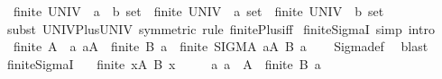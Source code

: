 \begin{isabellebody}
\ \ {\isachardoublequoteopen}finite\ {\isacharparenleft}{\kern0pt}UNIV\ {\isacharcolon}{\kern0pt}{\isacharcolon}{\kern0pt}\ {\isacharparenleft}{\kern0pt}{\isacharprime}{\kern0pt}a\ {\isacharplus}{\kern0pt}\ {\isacharprime}{\kern0pt}b{\isacharparenright}{\kern0pt}\ set{\isacharparenright}{\kern0pt}\ {\isasymlongleftrightarrow}\ finite\ {\isacharparenleft}{\kern0pt}UNIV\ {\isacharcolon}{\kern0pt}{\isacharcolon}{\kern0pt}\ {\isacharprime}{\kern0pt}a\ set{\isacharparenright}{\kern0pt}\ {\isasymand}\ finite\ {\isacharparenleft}{\kern0pt}UNIV\ {\isacharcolon}{\kern0pt}{\isacharcolon}{\kern0pt}\ {\isacharprime}{\kern0pt}b\ set{\isacharparenright}{\kern0pt}{\isachardoublequoteclose}\isanewline
%
\isadelimproof
\ \ %
\endisadelimproof
%
\isatagproof
{}\isamarkupfalse%
\ {\isacharparenleft}{\kern0pt}subst\ UNIV{\isacharunderscore}{\kern0pt}Plus{\isacharunderscore}{\kern0pt}UNIV\ {\isacharbrackleft}{\kern0pt}symmetric{\isacharbrackright}{\kern0pt}{\isacharparenright}{\kern0pt}\ {\isacharparenleft}{\kern0pt}rule\ finite{\isacharunderscore}{\kern0pt}Plus{\isacharunderscore}{\kern0pt}iff{\isacharparenright}{\kern0pt}%
\endisatagproof
{\isafoldproof}%
%
\isadelimproof
\isanewline
%
\endisadelimproof
\isanewline
{}\isamarkupfalse%
\ finite{\isacharunderscore}{\kern0pt}SigmaI\ {\isacharbrackleft}{\kern0pt}simp{\isacharcomma}{\kern0pt}\ intro{\isacharbrackright}{\kern0pt}{\isacharcolon}{\kern0pt}\isanewline
\ \ {\isachardoublequoteopen}finite\ A\ {\isasymLongrightarrow}\ {\isacharparenleft}{\kern0pt}{\isasymAnd}a{\isachardot}{\kern0pt}\ a{\isasymin}A\ {\isasymLongrightarrow}\ finite\ {\isacharparenleft}{\kern0pt}B\ a{\isacharparenright}{\kern0pt}{\isacharparenright}{\kern0pt}\ {\isasymLongrightarrow}\ finite\ {\isacharparenleft}{\kern0pt}SIGMA\ a{\isacharcolon}{\kern0pt}A{\isachardot}{\kern0pt}\ B\ a{\isacharparenright}{\kern0pt}{\isachardoublequoteclose}\isanewline
%
\isadelimproof
\ \ %
\endisadelimproof
%
\isatagproof
{}\isamarkupfalse%
\ Sigma{\isacharunderscore}{\kern0pt}def\ \isamarkupfalse%
\ blast%
\endisatagproof
{\isafoldproof}%
%
\isadelimproof
\isanewline
%
\endisadelimproof
\isanewline
{}\isamarkupfalse%
\ finite{\isacharunderscore}{\kern0pt}SigmaI{}{\isacharcolon}{\kern0pt}\isanewline
\ \ \ {\isachardoublequoteopen}finite\ {\isacharbraceleft}{\kern0pt}x{\isasymin}A{\isachardot}{\kern0pt}\ B\ x\ {\isasymnoteq}\ {\isacharbraceleft}{\kern0pt}{\isacharbraceright}{\kern0pt}{\isacharbraceright}{\kern0pt}{\isachardoublequoteclose}\isanewline
\ \ \ {\isachardoublequoteopen}{\isasymAnd}a{\isachardot}{\kern0pt}\ a\ {\isasymin}\ A\ {\isasymLongrightarrow}\ finite\ {\isacharparenleft}{\kern0pt}B\ a{\isacharparenright}{\kern0pt}{\isachardoublequoteclose}\isanewline

\end{isabellebody}
